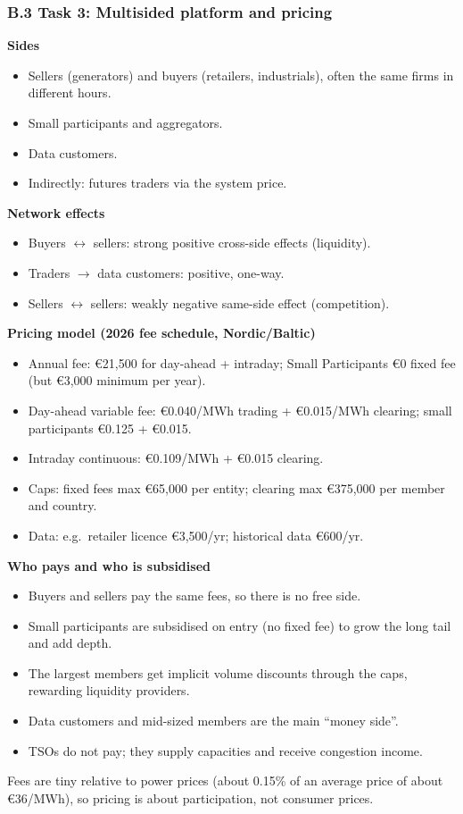 \subsubsection*{B.3 Task 3: Multisided platform and pricing}
\label{app:B3}
\begin{aiout}
\textbf{Sides}
\begin{itemize}
  \item Sellers (generators) and buyers (retailers, industrials), often the same firms in different hours.
  \item Small participants and aggregators.
  \item Data customers.
  \item Indirectly: futures traders via the system price.
\end{itemize}
\textbf{Network effects}
\begin{itemize}
  \item Buyers $\leftrightarrow$ sellers: strong positive cross-side effects (liquidity).
  \item Traders $\rightarrow$ data customers: positive, one-way.
  \item Sellers $\leftrightarrow$ sellers: weakly negative same-side effect (competition).
\end{itemize}
\textbf{Pricing model (2026 fee schedule, Nordic/Baltic)}
\begin{itemize}
  \item Annual fee: €21,500 for day-ahead + intraday; Small Participants €0 fixed fee (but €3,000 minimum per year).
  \item Day-ahead variable fee: €0.040/MWh trading + €0.015/MWh clearing; small participants €0.125 + €0.015.
  \item Intraday continuous: €0.109/MWh + €0.015 clearing.
  \item Caps: fixed fees max €65,000 per entity; clearing max €375,000 per member and country.
  \item Data: e.g.\ retailer licence €3,500/yr; historical data €600/yr.
\end{itemize}
\textbf{Who pays and who is subsidised}
\begin{itemize}
  \item Buyers and sellers pay the same fees, so there is no free side.
  \item Small participants are subsidised on entry (no fixed fee) to grow the long tail and add depth.
  \item The largest members get implicit volume discounts through the caps, rewarding liquidity providers.
  \item Data customers and mid-sized members are the main ``money side''.
  \item TSOs do not pay; they supply capacities and receive congestion income.
\end{itemize}
Fees are tiny relative to power prices (about 0.15\% of an average price of about €36/MWh), so pricing is about participation, not consumer prices.
\end{aiout}

